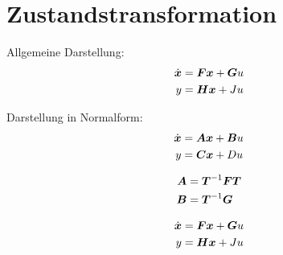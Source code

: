 \section{Zustandstransformation}

\begin{tcolorbox}[colback=white!10!white,colframe=green!60!black,title=Definition + Umrechnung]
\begin{minipage}{.45\textwidth}
    Allgemeine Darstellung:
    \begin{align*}
    \dot{\boldsymbol{x}} &= \boldsymbol{Fx} + \boldsymbol{G}u\\
    y &= \boldsymbol{Hx} +Ju
    \end{align*}
\end{minipage}
\begin{minipage}{.45\textwidth}
Darstellung in Normalform:
\begin{align*}
\dot{\boldsymbol{x}} &= \boldsymbol{Ax} + \boldsymbol{B}u\\
y &= \boldsymbol{Cx} +Du
\end{align*}
\end{minipage}
\tcblower
\begin{minipage}{.45\textwidth}
    \begin{align*}
    \boldsymbol{A} &= \boldsymbol{T}^{-1}\boldsymbol{F}\boldsymbol{T}\\
 \boldsymbol{B} &= \boldsymbol{T}^{-1}\boldsymbol{G}
    \end{align*}
\end{minipage}
\begin{minipage}{.45\textwidth}
    \begin{align*}
        \dot{\boldsymbol{x}} &= \boldsymbol{Fx} + \boldsymbol{G}u\\
        y &= \boldsymbol{Hx} +Ju
    \end{align*}
\end{minipage}

\end{tcolorbox}



 


